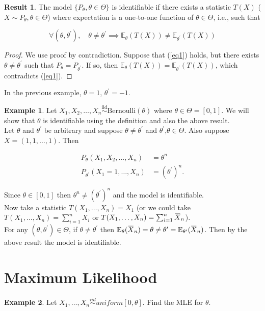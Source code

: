 \documentclass[12pt]{article}
\newcommand{\overbar}[1]{\mkern 1.5mu\overline{\mkern-1.5mu#1\mkern-1.5mu}\mkern 1.5mu}
\theoremstyle{definition}
\newtheorem*{example}{Example}
\newtheorem*{result}{Result}
\begin{document}
\begin{result}
The model $\{P_{\theta}, \theta \in \Theta \}$ is identifiable if there exists 
a statistic $T(X)$ ($X \sim P_{\theta}, \theta \in \Theta$) where 
expectation is a one-to-one function of $\theta \in \Theta$, i.e., such that

\begin{equation}\label{eq1}
\forall (\theta, \theta^{\prime}), \quad \theta \neq \theta^{\prime} \implies 
\mathbb{E}_{\theta}(T(X)) \neq \mathbb{E}_{\theta^{\prime}}(T(X))
\end{equation}

\begin{proof}
We use proof by contradiction. Suppose that (\ref{eq1}) holds, but there
exists $\theta \neq \theta^{\prime}$ such that $P_{\theta} = P_{\theta^{\prime}}$.
If so, then $\mathbb{E}_{\theta}(T(X)) = \mathbb{E}_{\theta^{\prime}}(T(X))$,
which contradicts (\ref{eq1}).
\end{proof}
\end{result}


In the previous example, $\theta = 1$, $\theta^{\prime} = -1$.

\begin{example}
Let $X_1, X_2, \ldots, X_n \overset{\mathrm{iid}}{\sim} \text{Bernoulli}(\theta)$
where $\theta \in \Theta = [0, 1]$. We will show that $\theta$ is identifiable
using the definition and also the above result.\\

Let $\theta$ and $\theta^{\prime}$ be arbitrary and suppose 
$\theta \neq \theta^{\prime}$ and $\theta^{\prime}$,$\theta \in \Theta$. Also
suppose $X = (1, 1, \ldots, 1)$. Then

\begin{align*}
P_{\theta}(X_1, X_2, \ldots, X_n) &= \theta^{n}\\
P_{\theta^{\prime}}(X_1 = 1, \ldots, X_n) &= (\theta^{\prime})^{n}.
\end{align*}

Since $\theta \in [0,1]$ then $\theta^n \neq (\theta^{\prime})^n$ and the model
is identifiable.\\

Now take a statistic $T(X_1, \ldots, X_n) = X_1$ (or we could take 
$T(X_1, \ldots, X_n) = \sum^{n}_{i=1} X_i$ or
$T(X_1, \ldots, X_n) = \sum^{n}_{i=1} \overbar{X}_n$).\\

For any 
$(\theta, \theta^{\prime}) \in \Theta$, if $\theta \neq \theta^{\prime}$
then $\mathbb{E}_{\theta}(\overbar{X}_n) = \theta \neq \theta^{\prime} = 
\mathbb{E}_{\theta^{\prime}}(\overbar{X}_n)$. Then by the above result
the model is identifiable.
\end{example}


\section{Maximum Likelihood}

\begin{example}
Let $X_1, \ldots, X_n \overset{iid}{\sim} uniform[0,\theta]$. Find the MLE for $\theta$.
\end{example}
\end{document}
